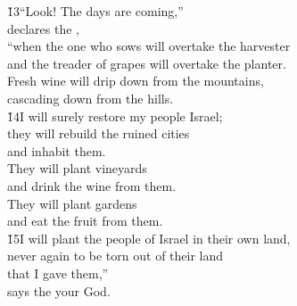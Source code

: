 \begin{poetry}
\poeml \v{13}``Look! The days are coming,'' \\
\poemll    declares the , \\
\poeml ``when the one who sows will overtake the harvester \\
\poemll    and the treader of grapes will overtake the planter. \\
\poeml Fresh wine will drip down from the mountains, \\
\poemll    cascading down from the hills. \\
\poeml \v{14}I will surely restore my people Israel; \\
\poemll    they will rebuild the ruined cities \\
\poemlll       and inhabit them. \\
\poeml They will plant vineyards \\
\poemll    and drink the wine from them. \\
\poeml They will plant gardens \\
\poemll    and eat the fruit from them. \\
\poeml \v{15}I will plant the people of Israel in their own land, \\
\poemll    never again to be torn out of their land \\
\poemlll       that I gave them,'' \\
\poemll    says the  your God.\end{poetry}
